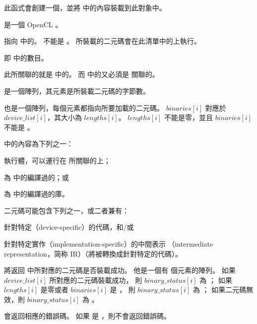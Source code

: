 此函式會創建一個，並將  中的內容裝載到此對象中。

 是一個 OpenCL 。

 指向  中的。
 不能是 。
所裝載的二元碼會在此清單中的上執行。

 即  中的數目。

此所關聯的就是  中的。
而  中的又必須是  關聯的。

 是一個陣列，其元素是所裝載二元碼的字節數。

 也是一個陣列，每個元素都指向所要加載的二元碼。
$binaries[i]$ 對應於 $device\_list[i]$，其大小為 $lengths[i]$。
$lengths[i]$ 不能是零，並且 $binaries[i]$ 不能是 。

 中的內容為下列之一：
\startigBase
\item {}執行體，可以運行在  所關聯的上；

\item 為  中的編譯過的；或

\item 為  中的編譯過的庫。
\stopigBase

二元碼可能包含下列之一，或二者兼有：
\startigBase
\item 針對特定（device-specific）的代碼，和/或
\item 針對特定實作（implementation-specific）的中間表示
（intermediate representation，简称 IR）（將被轉換成針對特定的代碼）。
\stopigBase

 將返回
 中所對應的二元碼是否裝載成功。
他是一個有  個元素的陣列。
如果 $device\_list[i]$ 所對應的二元碼裝載成功，
則 $binary\_status[i]$ 為 ；
如果 $lengths[i]$ 是零或者 $binaries[i]$ 是 ，
則 $binary\_status[i]$ 為 ；
如果二元碼無效，則 $binary\_status[i]$ 為 。

 會返回相應的錯誤碼。
如果  是 ，則不會返回錯誤碼。

